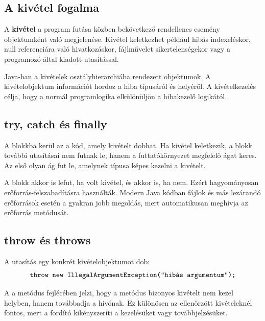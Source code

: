 \subsection{A kivétel fogalma}

A \textbf{kivétel} a program futása közben bekövetkező rendellenes esemény objektumként való megjelenése. Kivétel keletkezhet például hibás indexeléskor, null referenciára való hivatkozáskor, fájlművelet sikertelenségekor vagy a programozó által kiadott  utasítással.

Java-ban a kivételek osztályhierarchiába rendezett objektumok. A kivételobjektum információt hordoz a hiba típusáról és helyéről. A kivételkezelés célja, hogy a normál programlogika elkülönüljön a hibakezelő logikától.

\begin{center}

\end{center}

\subsection{try, catch és finally}

A  blokkba kerül az a kód, amely kivételt dobhat. Ha kivétel keletkezik, a  blokk további utasításai nem futnak le, hanem a futtatókörnyezet megfelelő  ágat keres. Az első olyan  ág fut le, amelynek típusa képes kezelni a kivételt.

A  blokk akkor is lefut, ha volt kivétel, és akkor is, ha nem. Ezért hagyományosan erőforrás-felszabadításra használták. Modern Java kódban fájlok és más lezárandó erőforrások esetén a  gyakran jobb megoldás, mert automatikusan meghívja az erőforrás  metódusát.

\subsection{throw és throws}

A  utasítás egy konkrét kivételobjektumot dob:
\[
  \texttt{throw new IllegalArgumentException("hibás argumentum");}
\]

A  a metódus fejlécében jelzi, hogy a metódus bizonyos kivételt nem kezel helyben, hanem továbbadja a hívónak. Ez különösen az ellenőrzött kivételeknél fontos, mert a fordító kikényszeríti a kezelésüket vagy továbbjelzésüket.

